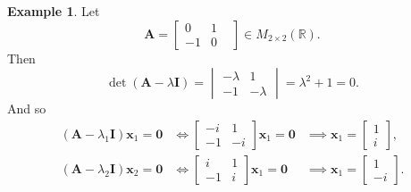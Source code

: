 \documentclass[12pt,openany]{book}
\theoremstyle{definition}
\newtheorem{example}{Example}[chapter]
\newcommand{\R}{\mathbb{R}}
\newcommand{\by}{\times}
\begin{document}
	\begin{example}
		Let \[
		\textbf{A}=\begin{bmatrix}
			0&1&\\-1&0
		\end{bmatrix}\in M_{2\by 2}(\R).
		\] Then \[
		\det(\textbf{A}-\lambda\textbf{I})=\begin{vmatrix}
			-\lambda&1\\-1&-\lambda
		\end{vmatrix}=\lambda^2+1=0.
		\] And so \begin{align*}
			(\textbf{A}-\lambda_1\textbf{I})\textbf{x}_1=\textbf{0}&\iff\begin{bmatrix}
				-i&1\\-1&-i
			\end{bmatrix}\textbf{x}_1=\textbf{0}&\implies\textbf{x}_1=\begin{bmatrix}
			1\\i
		\end{bmatrix},\\
		(\textbf{A}-\lambda_2\textbf{I})\textbf{x}_2=\textbf{0}&\iff\begin{bmatrix}
		i&1\\-1&i
	\end{bmatrix}\textbf{x}_1=\textbf{0}&\implies\textbf{x}_1=\begin{bmatrix}
	1\\-i
\end{bmatrix}.
		\end{align*}
	\end{example}
	\vspace{4pt}
\end{document}
